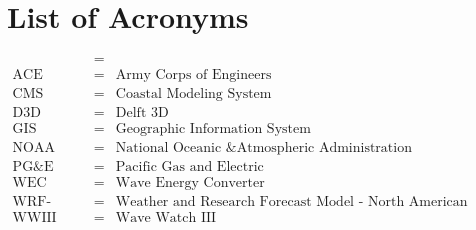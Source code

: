 \documentclass[11pt,letterpaper,oneside,reqno]{article}
\begin{document}
\newpage
\section{List of Acronyms}
\label{loacronyms} 
\begin{singlespace}
\begin{eqnarray*}
\mbox{} & = & \mbox{}\\
\mbox{ACE} & = & \mbox{Army Corps of Engineers}\\
\mbox{CMS} & = & \mbox{Coastal Modeling System}\\
\mbox{D3D} & = & \mbox{Delft 3D}\\
\mbox{GIS} & = & \mbox{Geographic Information System}\\
\mbox{NOAA} & = & \mbox{National Oceanic \& Atmospheric Administration}\\
\mbox{PG\&E} & = & \mbox{Pacific Gas and Electric}\\
\mbox{WEC} & = & \mbox{Wave Energy Converter}\\
\mbox{WRF-NAM} & = & \mbox{Weather and Research Forecast Model - North American Mesoscale}\\
\mbox{WWIII} & = & \mbox{Wave Watch III}\\
\end{eqnarray*}
\end{singlespace}




\end{document}

